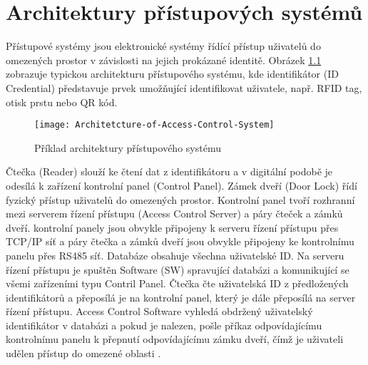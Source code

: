 \chapter{Architektury přístupových systémů}
Přístupové systémy jsou elektronické systémy řídící přístup uživatelů do omezených prostor v závislosti na jejich prokázané identitě.
Obrázek \ref{fig:Access control system architecture} zobrazuje typickou architekturu přístupového systému, kde identifikátor (ID Credential) představuje prvek umožňující identifikovat uživatele, např. RFID tag, otisk prstu nebo QR kód. 

\begin{figure}[!h]
    \centering
    \texttt{[image: Architetcture-of-Access-Control-System]}
    \caption{Příklad architektury přístupového systému \cite{accessControlSystem_eiprocus}}
    \label{fig:Access control system architecture}
\end{figure}

Čtečka (Reader) slouží ke čtení dat z identifikátoru a v digitální podobě je odesílá k zařízení kontrolní panel (Control Panel).
Zámek dveří (Door Lock) řídí fyzický přístup uživatelů do omezených prostor. 
Kontrolní panel tvoří rozhranní mezi serverem řízení přístupu (Access Control Server) a páry čteček a zámků dveří.
kontrolní panely jsou obvykle připojeny k serveru řízení přístupu přes TCP/IP síť a páry čtečka a zámků dveří jsou obvykle připojeny ke kontrolnímu panelu přes RS485 síť. Databáze obsahuje všechna uživatelské ID.
Na serveru řízení přístupu je spuštěn Software (SW) spravující databázi a komunikující se všemi zařízeními typu Contril Panel.
Čtečka čte uživatelská ID z předložených identifikátorů a přeposílá je na kontrolní panel, který je dále přeposílá na server řízení přístupu. 
Access Control Software vyhledá obdržený uživatelský identifikátor v databázi a pokud je nalezen, pošle příkaz odpovídajícímu kontrolnímu panelu k přepnutí odpovídajícímu zámku dveří, čímž je uživateli udělen přístup do omezené oblasti \cite{accessControlSystem_eiprocus}.
